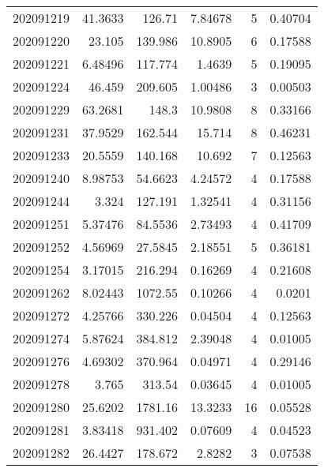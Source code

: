 \begin{tabular}{rrrrrr}
 202091219 &         41.3633  &      126.71   &            7.84678 &           5 & 0.40704 \\
 202091220 &         23.105   &      139.986  &           10.8905  &           6 & 0.17588 \\
 202091221 &          6.48496 &      117.774  &            1.4639  &           5 & 0.19095 \\
 202091224 &         46.459   &      209.605  &            1.00486 &           3 & 0.00503 \\
 202091229 &         63.2681  &      148.3    &           10.9808  &           8 & 0.33166 \\
 202091231 &         37.9529  &      162.544  &           15.714   &           8 & 0.46231 \\
 202091233 &         20.5559  &      140.168  &           10.692   &           7 & 0.12563 \\
 202091240 &          8.98753 &       54.6623 &            4.24572 &           4 & 0.17588 \\
 202091244 &          3.324   &      127.191  &            1.32541 &           4 & 0.31156 \\
 202091251 &          5.37476 &       84.5536 &            2.73493 &           4 & 0.41709 \\
 202091252 &          4.56969 &       27.5845 &            2.18551 &           5 & 0.36181 \\
 202091254 &          3.17015 &      216.294  &            0.16269 &           4 & 0.21608 \\
 202091262 &          8.02443 &     1072.55   &            0.10266 &           4 & 0.0201  \\
 202091272 &          4.25766 &      330.226  &            0.04504 &           4 & 0.12563 \\
 202091274 &          5.87624 &      384.812  &            2.39048 &           4 & 0.01005 \\
 202091276 &          4.69302 &      370.964  &            0.04971 &           4 & 0.29146 \\
 202091278 &          3.765   &      313.54   &            0.03645 &           4 & 0.01005 \\
 202091280 &         25.6202  &     1781.16   &           13.3233  &          16 & 0.05528 \\
 202091281 &          3.83418 &      931.402  &            0.07609 &           4 & 0.04523 \\
 202091282 &         26.4427  &      178.672  &            2.8282  &           3 & 0.07538 \\

\end{tabular}

